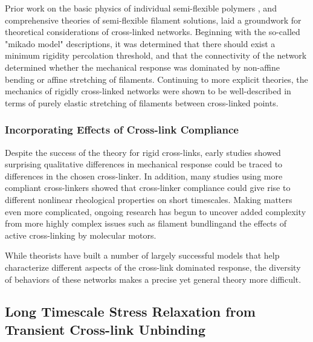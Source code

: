 \documentclass[pre,preprint]{revtex4-1}
\begin{document}
Prior work on the basic physics of individual semi-flexible polymers \cite{mol_wlc,theo_doi_ed}, and comprehensive theories of semi-flexible filament solutions, \cite{theo_morse} laid a groundwork for theoretical considerations of cross-linked networks. Beginning with the so-called "mikado model" descriptions\cite{theo_hlm,theo_hlm2}, it was determined that there should exist a minimum rigidity percolation threshold, and that the connectivity of the network determined whether the mechanical response was dominated by non-affine bending or affine stretching of filaments.   Continuing to more explicit theories\cite{theo_best}, the mechanics of rigidly cross-linked networks were shown to be well-described in terms of purely elastic stretching of filaments between cross-linked points.  

\subsubsection{Incorporating Effects of Cross-link Compliance}

Despite the success of the theory for rigid cross-links, early studies showed surprising qualitative differences in mechanical response could be traced to differences in the chosen cross-linker\cite{rheo_crosslinkcompare,rheo_crosslinkreview}.  In addition, many studies using more compliant cross-linkers showed that cross-linker compliance could give rise to different nonlinear rheological properties on short timescales\cite{rheo_crosslink_nonlin1,rheo_crosslink_nonlin2,rheo_crosslink_nonlin3,rheo_crosslink_notactin}. Making matters even more complicated, ongoing research has begun to uncover added complexity from more highly complex issues such as filament bundling\cite{theo_crosslinkslip2,model_massive}and the effects of active cross-linking by molecular motors\cite{rheo_active}.

While theorists have built a number of largely successful models that help characterize different aspects of the cross-link dominated response\cite{theo_nonaffine2,theo_floppy,theo_crosslinknonlinear}, the diversity of behaviors of these networks makes a precise yet general theory more difficult.

\subsection{Long Timescale Stress Relaxation from Transient Cross-link Unbinding}
\end{document}
